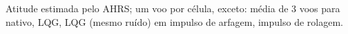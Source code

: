 Atitude estimada pelo AHRS; um voo por célula, exceto: média de 3 voos para nativo, LQG, LQG (mesmo ruído) em impulso de arfagem, impulso de rolagem.

